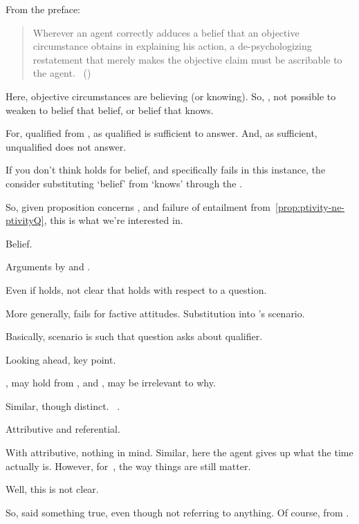 \begin{note}
{    From the preface:
    \begin{quote}
      Wherever an agent correctly adduces a belief that an objective circumstance obtains in explaining his action, a de-psychologizing restatement that merely makes the objective claim must be ascribable to the agent.%
      \mbox{ }\hfill\mbox{(\citeyear[120]{Collins:1997wn})}
    \end{quote}

    Here, objective circumstances are believing (or knowing).
    So, \citeauthor{Collins:1997wn}, not possible to weaken to belief that belief, or belief that knows.
  }

  For, qualified from \agpe{}, as qualified is sufficient to answer.
  And, as sufficient, unqualified does not answer.

  If you don't think \ptivity{} holds for belief, and specifically fails in this instance, the consider substituting `belief' from `knows' through the .
\end{note}


\begin{note}
  So, given proposition concerns \qzS{}, and failure of entailment from~\autoref{prop:ptivity-ne-ptivityQ}, this is what we're interested in.
\end{note}


\begin{note}
  Belief.

  Arguments by \citeauthor{Collins:1997wn} and \citeauthor{Dancy:2000aa}.
\end{note}

\begin{note}
  Even if \ptivity{} holds, not clear that holds with respect to a question.
\end{note}


\begin{note}
  More generally, fails for factive attitudes.
  Substitution into \citeauthor{Hyman:1999tm}'s scenario.

  Basically, scenario is such that question asks about qualifier.

  Looking ahead, key point.
\end{note}


\begin{note}
  \citeauthor{Collins:1997wn}, may hold from \agpe{}, and \citeauthor{Hyman:1999tm}, \agpe{} may be irrelevant to why.
\end{note}


\begin{note}
  Similar, though distinct.
  ~\cite{Donnellan:1966wt}.

  Attributive and referential.

  With attributive, nothing in mind.
  Similar, here the agent gives up what the time actually is.
  However, for~\citeauthor{Donnellan:1966wt}, the way things are still matter.

  Well, this is not clear.

  So, said something true, even though not referring to anything.
  Of course, from \agpe{}.
\end{note}

